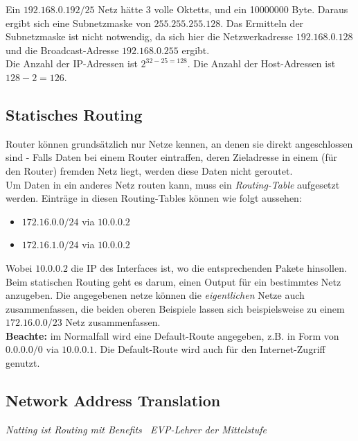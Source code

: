 \documentclass[a4paper, 12pt]{report}
\begin{document}
Ein $192.168.0.192/25$ Netz hätte 3 volle Oktetts, und ein 10000000 Byte. Daraus 
ergibt sich eine Subnetzmaske von $255.255.255.128$. Das Ermitteln der 
Subnetzmaske ist nicht notwendig, da sich hier die Netzwerkadresse 
$192.168.0.128$ und die Broadcast-Adresse $192.168.0.255$ ergibt. \\

Die Anzahl der IP-Adressen ist $2^{32-25 = 128}$. Die Anzahl der Host-Adressen 
ist $128 - 2 = 126$. 

\subsection{Statisches Routing}

Router können grundsätzlich nur Netze kennen, an denen sie direkt angeschlossen 
sind - Falls Daten bei einem Router eintraffen, deren Zieladresse in einem (für 
den Router) fremden Netz liegt, werden diese Daten nicht geroutet. \\

Um Daten in ein anderes Netz routen kann, muss ein \emph{Routing-Table} 
aufgesetzt werden. Einträge in diesen Routing-Tables können wie folgt aussehen: 

\begin{itemize}
    \item $172.16.0.0/24$ via $10.0.0.2$
    \item $172.16.1.0/24$ via $10.0.0.2$
\end{itemize}

Wobei $10.0.0.2$ die IP des Interfaces ist, wo die entsprechenden Pakete 
hinsollen. Beim statischen Routing geht es darum, einen Output für ein 
bestimmtes Netz anzugeben. Die angegebenen netze können die \emph{eigentlichen}
Netze auch zusammenfassen, die beiden oberen Beispiele lassen sich 
beispielsweise zu einem $172.16.0.0/23$ Netz zusammenfassen. \\

\textbf{Beachte:} im Normalfall wird eine Default-Route angegeben, z.B. in Form
von $0.0.0.0/0$ via $10.0.0.1$. Die Default-Route wird auch für den 
Internet-Zugriff genutzt. 

\subsection{Network Address Translation}

\noindent \emph{Natting ist Routing mit Benefits ~EVP-Lehrer der Mittelstufe}\\
\end{document}
